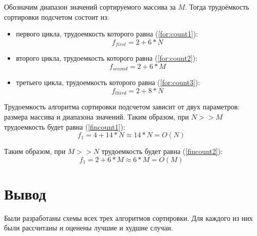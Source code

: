 Обозначим диапазон значений сортируемого массива за $M$. Тогда трудоёмкость сортировки подсчетом состоит из:
\begin{itemize}
	\item первого цикла, трудоемкость которого равна (\ref{for:count1}):
	\begin{equation}
		\label{for:count1}
		f_{first} = 2 + 6 * N
	\end{equation}
	\item второго цикла, трудоемкость которого равна (\ref{for:count2}):
	\begin{equation}
		\label{for:count2}
		f_{second} = 2 + 6 * M
	\end{equation}
	\item третьего цикла, трудоемкость которого равна (\ref{for:count3}):
	\begin{equation}
		\label{for:count3}
		f_{third} = 2 + 8 * N
	\end{equation}
\end{itemize}

Трудоемкость алгоритма сортировки подсчетом зависит от двух параметров: размера массива и диапазона значений. Таким образом, при $N >> M$ трудоемкость будет равна (\ref{fincount1}):
\begin{equation}
	\label{fincount1}
	f_{1} = 4 + 14 * N \approx 14 * N = O(N)
\end{equation}

Таким образом, при $M >> N$ трудоемкость будет равна (\ref{fincount2}):
\begin{equation}
	\label{fincount2}
	f_{1} = 2 + 6 * M \approx 6 * M = O(M)
\end{equation}


\section*{Вывод}

Были разработаны схемы всех трех алгоритмов сортировки. Для каждого из них были рассчитаны и оценены лучшие и худшие случаи.


